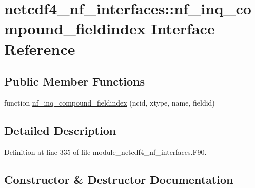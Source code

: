 \hypertarget{interfacenetcdf4__nf__interfaces_1_1nf__inq__compound__fieldindex}{}\section{netcdf4\+\_\+nf\+\_\+interfaces\+:\+:nf\+\_\+inq\+\_\+compound\+\_\+fieldindex Interface Reference}
\label{interfacenetcdf4__nf__interfaces_1_1nf__inq__compound__fieldindex}
\subsection*{Public Member Functions}
\begin{DoxyCompactItemize}
\item 
function \hyperlink{interfacenetcdf4__nf__interfaces_1_1nf__inq__compound__fieldindex_a4bb8d29cdfa84273277b40a2ffc3e94d}{nf\+\_\+inq\+\_\+compound\+\_\+fieldindex} (ncid, xtype, name, fieldid)
\end{DoxyCompactItemize}


\subsection{Detailed Description}


Definition at line 335 of file module\+\_\+netcdf4\+\_\+nf\+\_\+interfaces.\+F90.



\subsection{Constructor \& Destructor Documentation}
\mbox{\label{interfacenetcdf4__nf__interfaces_1_1nf__inq__compound__fieldindex_a4bb8d29cdfa84273277b40a2ffc3e94d}} 
